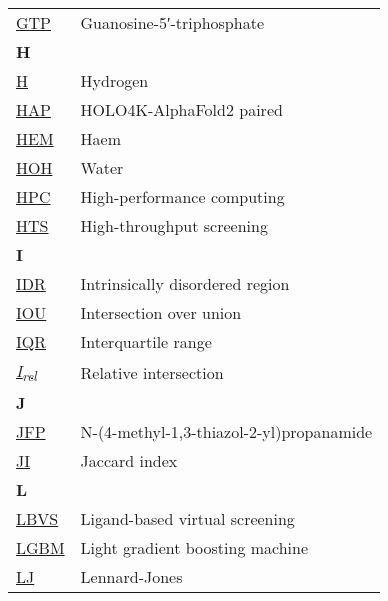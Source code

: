 \begin{longtable}[l]{@{}p{2.5cm}p{12cm}@{}}
\textmd{\href{https://www.ebi.ac.uk/pdbe-srv/pdbechem/chemicalCompound/show/GTP}{GTP}} & Guanosine-5′-triphosphate \\[0.3175cm]
\textbf{\large H} & \\[0.25cm]
\textmd{\href{https://en.wikipedia.org/wiki/Hydrogen}{H}} & Hydrogen \\
\textmd{\href{https://jcheminf.biomedcentral.com/articles/10.1186/s13321-024-00821-4}{HAP}} & HOLO4K-AlphaFold2 paired \\
\textmd{\href{https://www.ebi.ac.uk/pdbe-srv/pdbechem/chemicalCompound/show/HEM}{HEM}} & Haem \\
\textmd{\href{https://www.ebi.ac.uk/pdbe-srv/pdbechem/chemicalCompound/show/HOH}{HOH}} & Water \\
\textmd{\href{https://en.wikipedia.org/wiki/High-performance_computing}{HPC}} & High-performance computing \\
\textmd{\href{https://en.wikipedia.org/wiki/High-throughput_screening}{HTS}} & High-throughput screening \\[0.3175cm]
\textbf{\large I} & \\[0.25cm]
\textmd{\href{https://en.wikipedia.org/wiki/Intrinsically_disordered_proteins}{IDR}} & Intrinsically disordered region \\
\textmd{\href{https://en.wikipedia.org/wiki/Jaccard_index}{IOU}} & Intersection over union \\
\textmd{\href{https://en.wikipedia.org/wiki/Interquartile_range}{IQR}} & Interquartile range \\
\textmd{\href{https://www.nature.com/articles/s42003-024-05970-8}{\textit{I\textsubscript{rel}}}} & Relative intersection \\[0.3175cm]
\textbf{\large J} & \\[0.25cm]
\textmd{\href{https://www.ebi.ac.uk/pdbe-srv/pdbechem/chemicalCompound/show/JFP}{JFP}} & N-(4-methyl-1,3-thiazol-2-yl)propanamide \\
\textmd{\href{https://en.wikipedia.org/wiki/Jaccard_index}{JI}} & Jaccard index \\[0.3175cm]
\textbf{\large L} & \\[0.25cm]
\textmd{\href{https://en.wikipedia.org/wiki/Virtual_screening\#Ligand-based_methods_2}{LBVS}} & Ligand-based virtual screening \\
\textmd{\href{https://en.wikipedia.org/wiki/LightGBM}{LGBM}} & Light gradient boosting machine \\
\textmd{\href{https://en.wikipedia.org/wiki/Lennard-Jones_potential}{LJ}} & Lennard-Jones \\[0.3175cm]

\end{longtable}
